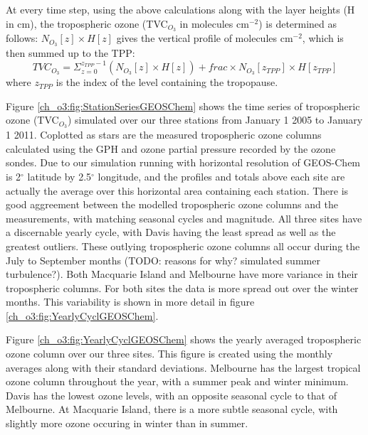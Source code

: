     At every time step, using the above calculations along with the layer heights (H in cm), the tropospheric ozone (TVC$_{O_3}$ in molecules cm$^{-2}$) is determined as follows: $N_{O_3}[z] \times H[z]$ gives the vertical profile of molecules cm$^{-2}$, which is then summed up to the TPP:
    \begin{equation*}
     TVC_{O_3} = \Sigma_{z=0}^{z_{TPP}-1} \left( N_{O_3}[z] \times H[z] \right) + frac \times N_{O_3}[z_{TPP}] \times H[z_{TPP}]
    \end{equation*}
    where $z_{TPP}$ is the index of the level containing the tropopause.
    
    Figure \ref{ch_o3:fig:StationSeriesGEOSChem} shows the time series of tropospheric ozone (TVC$_{O_3}$) simulated over our three stations from January 1 2005 to January 1 2011.
    Coplotted as stars are the measured tropospheric ozone columns calculated using the GPH and ozone partial pressure recorded by the ozone sondes.
    Due to our simulation running with horizontal resolution of GEOS-Chem is 2$^{\circ}$ latitude by 2.5$^{\circ}$ longitude, and the profiles and totals above each site are actually the average over this horizontal area containing each station.
    There is good aggreement between the modelled tropospheric ozone columns and the measurements, with matching seasonal cycles and magnitude.
    All three sites have a discernable yearly cycle, with Davis having the least spread as well as the greatest outliers.
    These outlying tropospheric ozone columns all occur during the July to September months (TODO: reasons for why? simulated summer turbulence?).
    Both Macquarie Island and Melbourne have more variance in their tropospheric columns.
    For both sites the data is more spread out over the winter months.
    This variability is shown in more detail in figure \ref{ch_o3:fig:YearlyCyclGEOSChem}.
    
    Figure \ref{ch_o3:fig:YearlyCyclGEOSChem} shows the yearly averaged tropospheric ozone column over our three sites.
    This figure is created using the monthly averages along with their standard deviations.
    Melbourne has the largest tropical ozone column throughout the year, with a summer peak and winter minimum.
    Davis has the lowest ozone levels, with an opposite seasonal cycle to that of Melbourne.
    At Macquarie Island, there is a more subtle seasonal cycle, with slightly more ozone occuring in winter than in summer.
    
